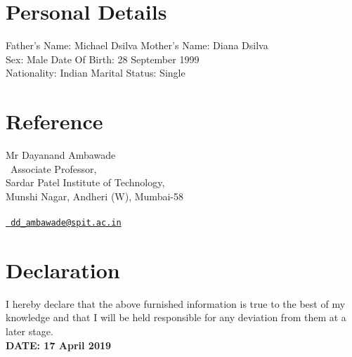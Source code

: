 \documentclass[11pt,a4paper,sans]{moderncv}   %
\begin{document}
	
	
	
	\section{Personal Details}
	Father's Name: Michael Dsilva 	\hspace{3cm}		Mother's Name: Diana Dsilva \\
	Sex: Male 				\hspace{6.35cm}		Date Of Birth: 28 September 1999 \\
	Nationality: Indian			\hspace{5.08cm}		Marital Status: Single
	



\section{Reference}

Mr Dayanand Ambawade    \\                                                                                    \
Associate Professor,      \\                                                        
Sardar Patel Institute of Technology,       \\                  
Munshi Nagar, Andheri (W), Mumbai-58     \\    
 \\    
\emailsymbol \href{mailto: dd_ambawade@spit.ac.in}{\nolinkurl{ dd_ambawade@spit.ac.in} }\\



\section{Declaration}
I hereby declare that the above furnished information is true to the best of my knowledge and that I will be held responsible for any deviation from them at a later stage. \\

\textbf{DATE: 17 April 2019}
\end{document}
